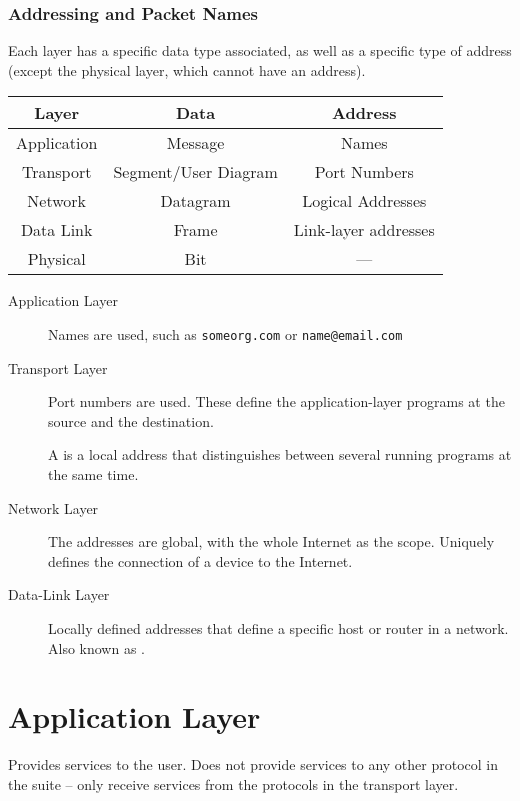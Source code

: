 \documentclass[\main/notes.tex]{subfiles}
\begin{document}
					\pagebreak
					\subsubsection{Addressing and Packet Names}
						Each layer has a specific data type associated, as well as a specific type of address (except the physical layer, which cannot have an address).
						\begin{center}
							\begin{tabular}{ccc}
								Layer & Data & Address\\
								\midrule
								Application & Message & Names\\
								Transport & Segment/User Diagram & Port Numbers\\
								Network & Datagram & Logical Addresses\\
								Data Link & Frame & Link-layer addresses\\
								Physical & Bit & ---
							\end{tabular}
						\end{center}
						\begin{indentparagraph}
							\begin{description}
								\item[Application Layer] Names are used, such as \texttt{someorg.com} or \texttt{name@email.com}
								\item[Transport Layer] Port numbers are used. These define the application-layer programs at the source and the destination.

								A  is a local address that distinguishes between several running programs at the same time.
								\item[Network Layer] The addresses are global, with the whole Internet as the scope. Uniquely defines the connection of a device to the Internet.
								\item[Data-Link Layer] Locally defined addresses that define a specific host or router in a network. Also known as .
							\end{description}
						\end{indentparagraph}

		\section{Application Layer}
			Provides services to the user. Does not provide services to any other protocol in the suite -- only receive services from the protocols in the transport layer.
\end{document}
